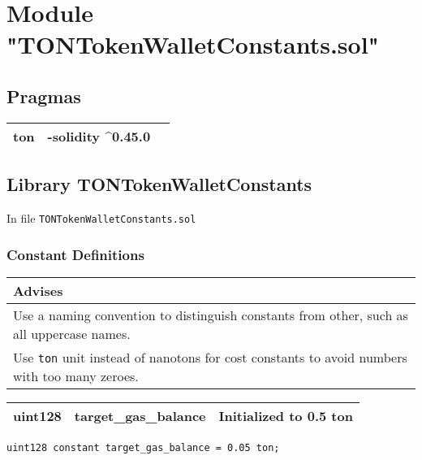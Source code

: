 
\section{Module "TONTokenWalletConstants.sol"}


\subsection{Pragmas}


\noindent\begin{tabular}{|l|l|p{5cm}|}\hline
ton & -solidity \^{}0.45.0 &\\\hline
\end{tabular}


\subsection{Library TONTokenWalletConstants}


In file {\tt TONTokenWalletConstants.sol}

\subsubsection{Constant Definitions}


\ifsoldraft
\noindent\begin{tabular}{|p{12cm}|}\hline
\rowcolor{green}Advises
\\\hline
Use a naming convention to distinguish constants from other, such as all uppercase names.
\\\hline
Use \verb+ton+ unit instead of nanotons for cost constants to avoid numbers with too many zeroes.
\\\hline\end{tabular}
\fi

\ifsoltables
\noindent\begin{tabular}{|l|l|p{5cm}|}\hline
uint128 & target\_{}gas\_{}balance & Initialized to 0.5 ton \\\hline
\end{tabular}
\fi


\begin{lstlisting}[firstnumber=4]
    uint128 constant target_gas_balance = 0.05 ton;
\end{lstlisting}
